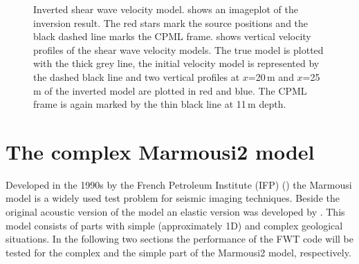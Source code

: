 \begin{figure}[ht]
\centering
{}%
\hspace{0.2 cm}
\caption{Inverted shear wave velocity model. \protect{} shows an imageplot of the inversion result. The red stars mark the source positions and the black dashed line marks the CPML frame. \protect{} shows vertical velocity profiles of the shear wave velocity models. The true model is plotted with the thick grey line, the initial velocity model is represented by the dashed black line and two vertical profiles at $x$=20\,m and $x$=25\,m of the inverted model are plotted in red and blue. The CPML frame is again marked by the thin black line at 11\,m depth.}
\label{Rheinstetten_inversion_result}
\end{figure}

\clearpage

\section{The complex Marmousi2 model}
\label{complex Marmousi model}
Developed in the 1990s by the French Petroleum Institute (IFP) (\cite{versteeg:94}) the Marmousi model is a widely used test problem for seismic imaging techniques. Beside the original acoustic version of the model an elastic version was developed by \cite{martin:06}. This model consists of parts with simple (approximately 1D) and complex geological situations. In the following two sections the performance of the FWT code will be tested for the complex and the simple part of the Marmousi2 model, respectively.

